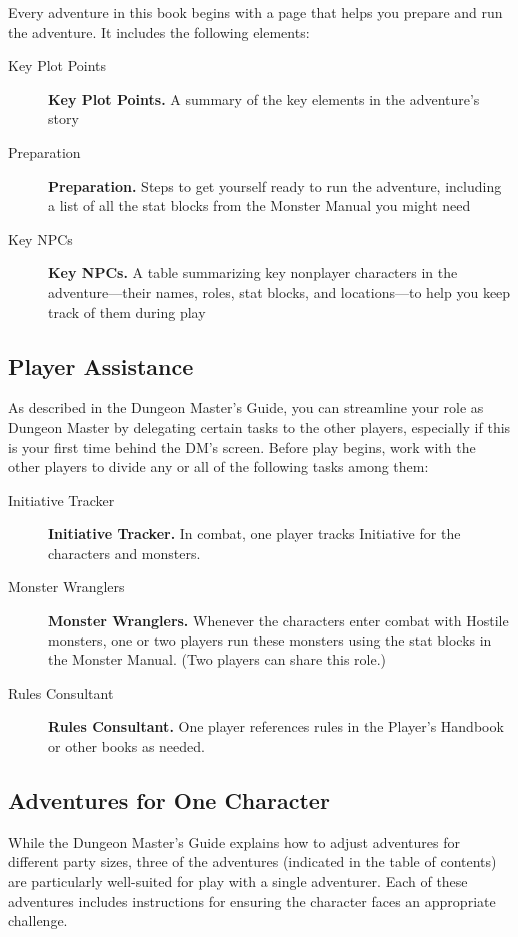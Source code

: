\documentclass[letterpaper, 11pt, twocolumn]{dndbook}
\begin{document}
Every adventure in this book begins with a page that helps you prepare and run the adventure. It includes the following elements:

\begin{description}
\item[Key Plot Points] \textbf{Key Plot Points.} A summary of the key elements in the adventure's story
\item[Preparation] \textbf{Preparation.} Steps to get yourself ready to run the adventure, including a list of all the stat blocks from the Monster Manual you might need
\item[Key NPCs] \textbf{Key NPCs.} A table summarizing key nonplayer characters in the adventure---their names, roles, stat blocks, and locations---to help you keep track of them during play
\end{description}

\subsection{Player Assistance}

As described in the Dungeon Master's Guide, you can streamline your role as Dungeon Master by delegating certain tasks to the other players, especially if this is your first time behind the DM's screen. Before play begins, work with the other players to divide any or all of the following tasks among them:

\begin{description}
\item[Initiative Tracker] \textbf{Initiative Tracker.} In combat, one player tracks Initiative for the characters and monsters.
\item[Monster Wranglers] \textbf{Monster Wranglers.} Whenever the characters enter combat with Hostile monsters, one or two players run these monsters using the stat blocks in the Monster Manual. (Two players can share this role.)
\item[Rules Consultant] \textbf{Rules Consultant.} One player references rules in the Player's Handbook or other books as needed.
\end{description}

\subsection{Adventures for One Character}

While the Dungeon Master's Guide explains how to adjust adventures for different party sizes, three of the adventures (indicated in the table of contents) are particularly well-suited for play with a single adventurer. Each of these adventures includes instructions for ensuring the character faces an appropriate challenge.
\end{document}
